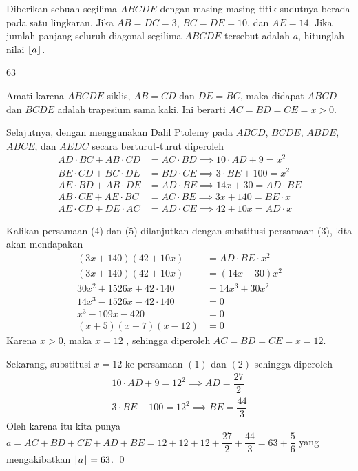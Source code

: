\documentclass[11pt]{scrartcl}
\begin{document}
	\begin{soalbaru}
		Diberikan sebuah segilima $ABCDE$ dengan masing-masing titik sudutnya berada pada satu lingkaran. Jika $AB=DC=3$, $BC=DE=10$, dan $AE=14$. Jika jumlah panjang seluruh diagonal segilima $ABCDE$ tersebut adalah $a$, hitunglah nilai $\left\lfloor a \right\rfloor$.
		\begin{jawaban}
		63
		\end{jawaban}
		\begin{solusi}
		Amati karena $ABCDE$ siklis, $AB=CD$ dan $DE=BC$, maka didapat $ABCD$ dan $BCDE$ adalah trapesium sama kaki. Ini berarti $AC=BD=CE=x > 0$.
		
		Selajutnya, dengan menggunakan Dalil Ptolemy pada $ABCD$, $BCDE$, $ABDE$, $ABCE$, dan $AEDC$ secara berturut-turut diperoleh 
		\begin{align}
		AD \cdot BC + AB \cdot CD &= AC \cdot BD \implies 10\cdot AD+9 = x^2\\
		BE \cdot CD + BC \cdot DE &= BD \cdot CE \implies 3 \cdot BE + 100 = x^2\\
		AE \cdot BD + AB \cdot DE &= AD \cdot BE \implies 14x+30 = AD \cdot BE\\
		AB \cdot CE + AE \cdot BC &= AC \cdot BE \implies 3x+140 = BE \cdot x\\
		AE \cdot CD + DE \cdot AC &= AD \cdot CE \implies 42+10x=AD \cdot x
		\end{align}
		
		Kalikan persamaan (4) dan (5) dilanjutkan dengan substitusi persamaan (3), kita akan mendapakan 
		\begin{align*}
		(3x+140)(42+10x) &= AD \cdot BE \cdot x^2\\
		(3x+140)(42+10x) &= (14x+30)x^2\\
		30x^2+1526x+42\cdot140 &= 14x^3+30x^2\\
		14x^3-1526x-42\cdot 140 &= 0\\
		x^3-109x-420 &= 0\\
		(x+5)(x+7)(x-12) &= 0
		\end{align*}
		 Karena $x>0$, maka $x=12$ , sehingga diperoleh $AC = BD = CE = x =12$.
		 
		 Sekarang, substitusi $x=12$ ke persamaan $(1)$ dan $(2)$ sehingga diperoleh 
		 \begin{align*}
		 10\cdot AD + 9 = 12^2 \implies AD = \dfrac{27}{2}\\
		 3\cdot BE + 100 = 12^2 \implies BE = \dfrac{44}{3}
		 \end{align*}
		 Oleh karena itu kita punya $a = AC +BD +CE +AD +BE = 12+12+12+\dfrac{27}{2}+\dfrac{44}{3}=63+\dfrac{5}{6}$ yang mengakibatkan $\left\lfloor a \right\rfloor=63$. \qed
		
		\end{solusi}
	\end{soalbaru}
	
\end{document}
